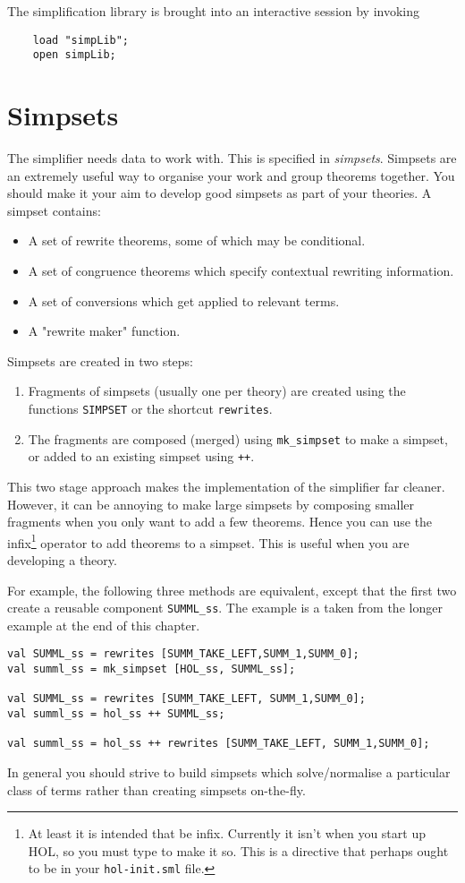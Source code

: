 \documentclass[a4]{article}
\begin{document}
The simplification library is brought into an interactive session by
invoking
\begin{verbatim}
    load "simpLib";
    open simpLib;
\end{verbatim}

\section{Simpsets}

The simplifier needs data to work with.  This is specified in
{\em simpsets}. Simpsets are an extremely useful way to organise
your work and group theorems together.  You should make it your
aim to develop good simpsets as part of your theories.
A simpset contains:
\begin{itemize}
    \item A set of rewrite theorems, some of which may be conditional.
    \item A set of congruence theorems which specify
          contextual rewriting information.
    \item A set of conversions which get applied to relevant terms.
    \item A "rewrite maker" function.
\end{itemize}
Simpsets are created in two steps:
\begin{enumerate}
   \item Fragments of simpsets (usually one per theory) are created
using the functions {\tt SIMPSET} or the shortcut {\tt rewrites}.
   \item The fragments are composed (merged) using {\tt mk\_simpset} to
make a simpset, or added to an existing simpset using {\tt ++}.
\end{enumerate}
This two stage approach makes the implementation of the simplifier far
cleaner.  However, it can be annoying to make large simpsets by
composing smaller fragments when you only want to add a few theorems.
Hence you can use the infix\footnote{At least it is intended that
\ml{++} be infix. Currently it isn't when you start up HOL, so you
must type  to make it so. This is a directive that perhaps
ought to be in your {\tt hol-init.sml} file.} operator \ml{++} to add
theorems to a simpset.  This is useful when you are developing a
theory.

For example, the following three methods are equivalent, except that the
first two create a reusable component {\tt SUMML\_ss}.  The example is a
taken from the longer example at the end of this chapter.
\begin{verbatim}
val SUMML_ss = rewrites [SUMM_TAKE_LEFT,SUMM_1,SUMM_0];
val summl_ss = mk_simpset [HOL_ss, SUMML_ss];

val SUMML_ss = rewrites [SUMM_TAKE_LEFT, SUMM_1,SUMM_0];
val summl_ss = hol_ss ++ SUMML_ss;

val summl_ss = hol_ss ++ rewrites [SUMM_TAKE_LEFT, SUMM_1,SUMM_0];
\end{verbatim}
In general you should strive to build simpsets which solve/normalise a
particular class of terms rather than creating simpsets on-the-fly.
\end{document}
